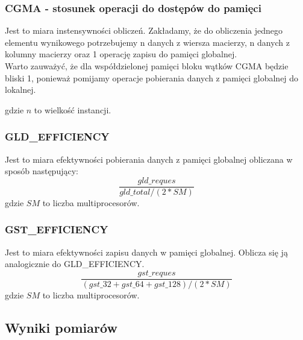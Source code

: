 \documentclass[10pt,a4paper]{article}
\begin{document}
\subsubsection*{CGMA - stosunek operacji do dostępów do pamięci}
Jest to miara instensywności obliczeń. Zakładamy, że do obliczenia jednego elementu
wynikowego potrzebujemy n danych z wiersza macierzy, n danych z kolumny macierzy
oraz 1 operację zapisu do pamięci globalnej.\\
Warto zauważyć, że dla współdzielonej pamięci bloku wątków CGMA będzie bliski 1,
ponieważ pomijamy operacje pobierania danych z pamięci globalnej do lokalnej.

gdzie $n$ to wielkość instancji.

\subsubsection*{GLD\_EFFICIENCY}
Jest to miara efektywności pobierania danych z pamięci globalnej obliczana w sposób
następujący:
\begin{equation}
	\frac{gld\_reques}{gld\_total / (2*SM)}
\end{equation}
gdzie $SM$ to liczba multiprocesorów.

\subsubsection*{GST\_EFFICIENCY}
Jest to miara efektywności zapisu danych w pamięci globalnej.
Oblicza się ją analogicznie
do GLD\_EFFICIENCY.
\begin{equation}
	\frac{gst\_reques}{(gst\_32 + gst\_64 + gst\_128) / (2*SM)}
\end{equation}
gdzie $SM$ to liczba multiprocesorów.

\subsection{Wyniki pomiarów}

\begin{table}
											
											
\end{table}
\end{document}
